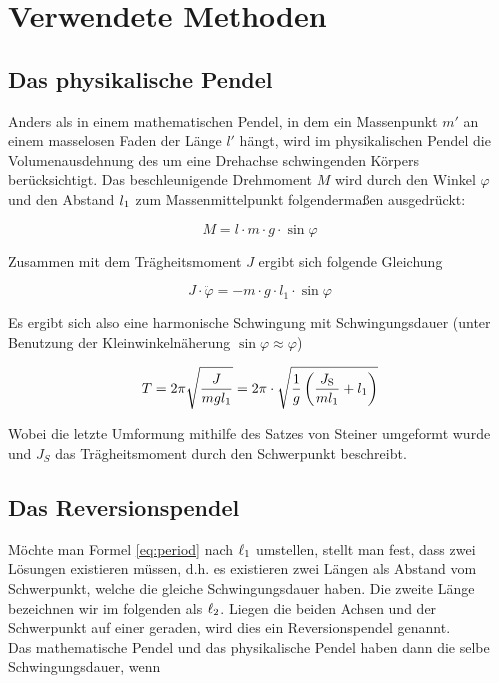 \section{Verwendete Methoden}
\subsection{Das physikalische Pendel}
Anders als in einem mathematischen Pendel, in dem ein Massenpunkt $m'$ an einem masselosen Faden der Länge $l'$ hängt, wird im physikalischen Pendel die Volumenausdehnung des um eine Drehachse schwingenden Körpers berücksichtigt. Das beschleunigende Drehmoment $M$ wird durch den Winkel $\varphi$ und den Abstand $l_{\mathrm{1}}$ zum Massenmittelpunkt folgendermaßen ausgedrückt:

\begin{equation*}
M = l \cdot m \cdot g \cdot \sin \varphi
\end{equation*}

Zusammen mit dem Trägheitsmoment $J$ ergibt sich folgende Gleichung

\begin{equation}
J \cdot \ddot{\varphi} = - m \cdot g \cdot l_1 \cdot \sin \varphi
\label{eq:basis}
\end{equation}

Es ergibt sich also eine harmonische Schwingung mit Schwingungsdauer (unter Benutzung der Kleinwinkelnäherung $\sin \varphi \approx \varphi$)

\begin{equation}
T = 2\pi \sqrt{\frac{J}{mgl_1}} = 2\pi \cdot  \sqrt{\frac{1}{g}\left(\frac{J_{\mathrm{S}}}{ml_1}+l_1\right)}
\label{eq:period}
\end{equation}

Wobei die letzte Umformung mithilfe des Satzes von Steiner umgeformt wurde und $J_S$ das Trägheitsmoment durch den Schwerpunkt beschreibt.

\subsection{Das Reversionspendel}
Möchte man Formel \ref{eq:period} nach $\ell_1$ umstellen, stellt man fest, dass zwei Lösungen existieren müssen, d.h. es existieren zwei Längen als Abstand vom Schwerpunkt, welche die gleiche Schwingungsdauer haben. Die zweite Länge bezeichnen wir im folgenden als $\ell_2$. Liegen die beiden Achsen und der Schwerpunkt auf einer geraden, wird dies ein Reversionspendel genannt.\\
Das mathematische Pendel und das physikalische Pendel haben dann die selbe Schwingungsdauer, wenn 

